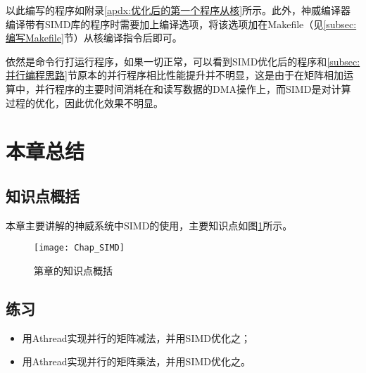 以此编写的程序如附录\ref{apdx:优化后的第一个程序从核}所示。此外，神威编译器编译带有SIMD库的程序时需要加上编译选项，将该选项加在Makefile（见\ref{subsec:编写Makefile}节）从核编译指令后即可。

依然是命令行打运行程序，如果一切正常，可以看到SIMD优化后的程序和\ref{subsec:并行编程思路}节原本的并行程序相比性能提升并不明显，这是由于在矩阵相加运算中，并行程序的主要时间消耗在和读写数据的DMA操作上，而SIMD是对计算过程的优化，因此优化效果不明显。

\section{本章总结}
\subsection{知识点概括}
本章主要讲解的神威系统中SIMD的使用，主要知识点如图\ref{fig:Chap_SIMD}所示。

\begin{figure}[!htbp]
	\centering
	\texttt{[image: Chap\_SIMD]}
	\caption{第\thechapter{}章的知识点概括}
	\label{fig:Chap_SIMD}
\end{figure}

\subsection{练习}
\begin{itemize}
	\item 用Athread实现并行的矩阵减法，并用SIMD优化之；
	\item 用Athread实现并行的矩阵乘法，并用SIMD优化之。
\end{itemize}